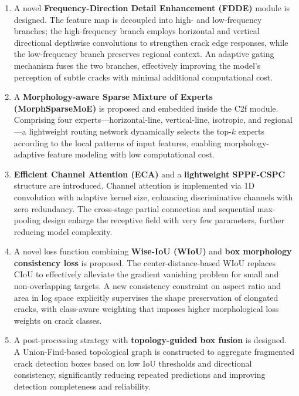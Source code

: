 \documentclass{ieeeaccess}
\begin{document}
{\begin{enumerate}
\item A novel \textbf{Frequency-Direction Detail Enhancement (FDDE)} module is designed. The feature map is decoupled into high- and low-frequency branches; the high-frequency branch employs horizontal and vertical directional depthwise convolutions to strengthen crack edge responses, while the low-frequency branch preserves regional context. An adaptive gating mechanism fuses the two branches, effectively improving the model's perception of subtle cracks with minimal additional computational cost.

\item A \textbf{Morphology-aware Sparse Mixture of Experts (MorphSparseMoE)} is proposed and embedded inside the C2f module. Comprising four experts---horizontal-line, vertical-line, isotropic, and regional---a lightweight routing network dynamically selects the top-$k$ experts according to the local patterns of input features, enabling morphology-adaptive feature modeling with low computational cost.

\item \textbf{Efficient Channel Attention (ECA)} and a \textbf{lightweight SPPF-CSPC} structure are introduced. Channel attention is implemented via 1D convolution with adaptive kernel size, enhancing discriminative channels with zero redundancy. The cross-stage partial connection and sequential max-pooling design enlarge the receptive field with very few parameters, further reducing model complexity.

\item A novel loss function combining \textbf{Wise-IoU (WIoU)} and \textbf{box morphology consistency loss} is proposed. The center-distance-based WIoU replaces CIoU to effectively alleviate the gradient vanishing problem for small and non-overlapping targets. A new consistency constraint on aspect ratio and area in log space explicitly supervises the shape preservation of elongated cracks, with class-aware weighting that imposes higher morphological loss weights on crack classes.

\item A post-processing strategy with \textbf{topology-guided box fusion} is designed. A Union-Find-based topological graph is constructed to aggregate fragmented crack detection boxes based on low IoU thresholds and directional consistency, significantly reducing repeated predictions and improving detection completeness and reliability.
\end{enumerate}

}
\end{document}
